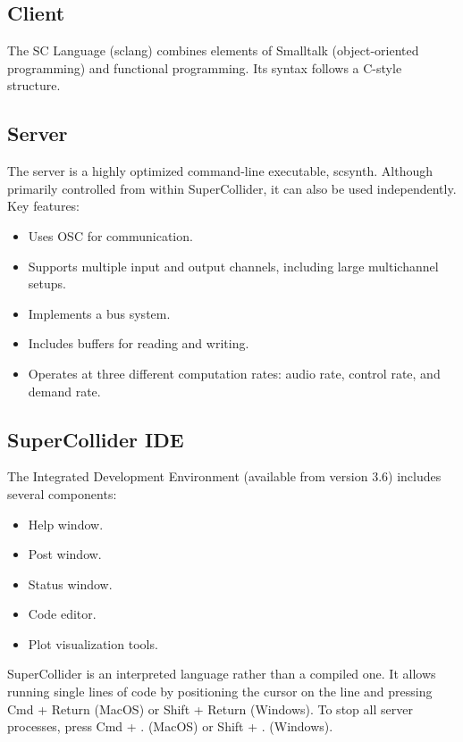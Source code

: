 \subsection{Client}

The SC Language (sclang) combines elements of Smalltalk (object-oriented programming) and functional programming. Its syntax follows a C-style structure.

\subsection{Server}

The server is a highly optimized command-line executable, scsynth. Although primarily controlled from within SuperCollider, it can also be used independently. Key features:

\begin{itemize}
    \item Uses OSC for communication.
    \item Supports multiple input and output channels, including large multichannel setups.
    \item Implements a bus system.
    \item Includes buffers for reading and writing.
    \item Operates at three different computation rates: audio rate, control rate, and demand rate.
\end{itemize}

\subsection{SuperCollider IDE}

The Integrated Development Environment (available from version 3.6) includes several components:

\begin{itemize}
    \item Help window.
    \item Post window.
    \item Status window.
    \item Code editor.
    \item Plot visualization tools.
\end{itemize}

SuperCollider is an interpreted language rather than a compiled one. It allows running single lines of code by positioning the cursor on the line and pressing Cmd + Return (MacOS) or Shift + Return (Windows). To stop all server processes, press Cmd + . (MacOS) or Shift + . (Windows).


